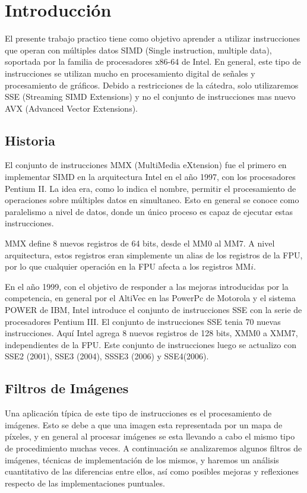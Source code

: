 \section{Introducción}

El presente trabajo practico tiene como objetivo aprender a utilizar instrucciones que operan con múltiples datos SIMD (Single instruction, multiple data), soportada por la familia de procesadores x86-64 de Intel. En general, este tipo de instrucciones se utilizan mucho en procesamiento digital de señales y procesamiento de gráficos. Debido a restricciones de la cátedra, solo utilizaremos SSE (Streaming SIMD Extensions) y no el conjunto de instrucciones mas nuevo AVX (Advanced Vector Extensions).
 
\subsection{Historia}
\small 
El conjunto de instrucciones MMX (MultiMedia eXtension) fue el primero en implementar SIMD en la arquitectura Intel en el año 1997, con los procesadores Pentium II. La idea era, como lo indica el nombre, permitir el procesamiento de operaciones sobre múltiples datos en simultaneo. Esto en general se conoce como paralelismo a nivel de datos, donde un único proceso es capaz de ejecutar estas instrucciones.

MMX define 8 nuevos registros de 64 bits, desde el MM0 al MM7. A nivel arquitectura, estos registros eran simplemente un alias de los registros de la FPU, por lo que cualquier operación en la FPU afecta a los registros MM$i$.

En el año 1999, con el objetivo de responder a las mejoras introducidas por la competencia, en general por el AltiVec en las PowerPc de Motorola y el sistema POWER de IBM, Intel introduce el conjunto de instrucciones SSE con la serie de procesadores Pentium III. El conjunto de instrucciones SSE tenia 70 nuevas instrucciones. Aquí Intel agrega 8 nuevos registros de 128 bits, XMM0 a XMM7, independientes de la FPU. Este conjunto de instrucciones luego se actualizo con SSE2 (2001), SSE3 (2004), SSSE3 (2006) y SSE4(2006).


\subsection{Filtros de Imágenes}

Una aplicación típica de este tipo de instrucciones es el procesamiento de imágenes. Esto se debe a que una imagen esta representada por un mapa de píxeles, y en general al procesar imágenes se esta llevando a cabo el mismo tipo de procedimiento muchas veces. A continuación se analizaremos algunos filtros de imágenes, técnicas de implementación de los mismos, y haremos un análisis cuantitativo de las diferencias entre ellos, así como posibles mejoras y reflexiones respecto de las implementaciones puntuales.

